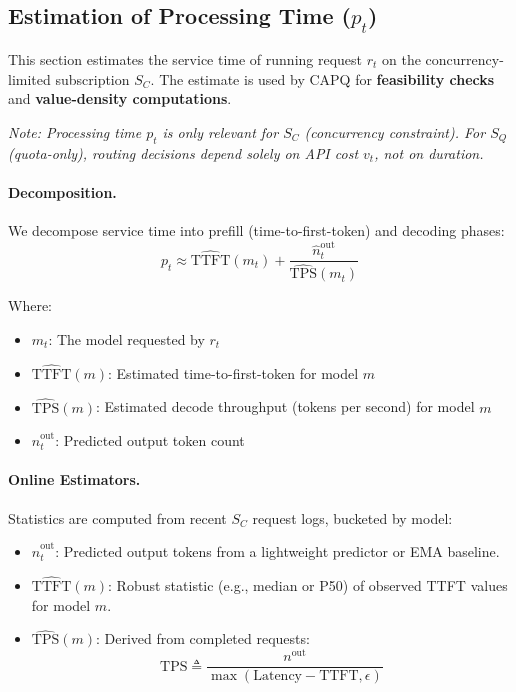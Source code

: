 \documentclass[11pt]{article}
\begin{document}
\subsection{Estimation of Processing Time ($p_t$)}

This section estimates the service time of running request $r_t$ on the concurrency-limited subscription $S_C$. The estimate is used by CAPQ for \textbf{feasibility checks} and \textbf{value-density computations}.

\emph{Note: Processing time $p_t$ is only relevant for $S_C$ (concurrency constraint). For $S_Q$ (quota-only), routing decisions depend solely on API cost $v_t$, not on duration.}

\paragraph{Decomposition.}
We decompose service time into prefill (time-to-first-token) and decoding phases:
\[ p_t \approx \widehat{\text{TTFT}}(m_t) + \frac{\hat{n}^{\text{out}}_t}{\widehat{\text{TPS}}(m_t)} \]

Where:
\begin{itemize}
  \item $m_t$: The model requested by $r_t$
  \item $\widehat{\text{TTFT}}(m)$: Estimated time-to-first-token for model $m$
  \item $\widehat{\text{TPS}}(m)$: Estimated decode throughput (tokens per second) for model $m$
  \item $\hat{n}^{\text{out}}_t$: Predicted output token count
\end{itemize}

\paragraph{Online Estimators.}
Statistics are computed from recent $S_C$ request logs, bucketed by model:
\begin{itemize}
  \item $\hat{n}^{\text{out}}_t$: Predicted output tokens from a lightweight predictor or EMA baseline.
  \item $\widehat{\text{TTFT}}(m)$: Robust statistic (e.g., median or P50) of observed TTFT values for model $m$.
  \item $\widehat{\text{TPS}}(m)$: Derived from completed requests:
  \[ \text{TPS} \triangleq \frac{n^{\text{out}}}{\max(\text{Latency} - \text{TTFT}, \epsilon)} \]
\end{itemize}
\end{document}
